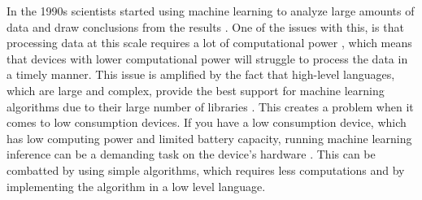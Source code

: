 In the 1990s scientists started using machine learning to analyze large amounts of data and draw conclusions from the results \cite{marr2016short}.
One of the issues with this, is that processing data at this scale requires a lot of computational power \cite{garcia2019estimation}, which means that devices with lower computational power will struggle to process the data in a timely manner.
This issue is amplified by the fact that high-level languages, which are large and complex, provide the best support for machine learning algorithms due to their large number of libraries \cite{top5mllangs}. 
This creates a problem when it comes to low consumption devices. 
If you have a low consumption device, which has low computing power and limited battery capacity, running machine learning inference can be a demanding task on the device's hardware  . 
This can be combatted by using simple algorithms,  which requires less computations and by implementing the algorithm in a low level language. \\



